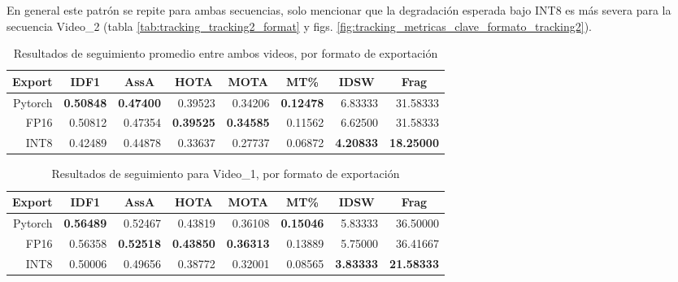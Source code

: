 En general este patrón se repite para ambas secuencias, solo mencionar que la degradación esperada bajo INT8 es más severa para la secuencia Video\_2 (tabla \ref{tab:tracking_tracking2_format} y figs. \ref{fig:tracking_metricas_clave_formato_tracking2}).

\begin{table}[htbp]
\centering
\caption[Resultados de seguimiento promedio entre ambos videos, por formato de exportación.]{Resultados de seguimiento promedio entre ambos videos, por formato de exportación}
\label{tab:tracking_average_format}
\begin{tabular}{|r|r|r|r|r|r|r|r|}
\hline
\multicolumn{1}{|c|}{\textbf{Export}} & \multicolumn{1}{c|}{\textbf{IDF1}} & \multicolumn{1}{c|}{\textbf{AssA}} & \multicolumn{1}{c|}{\textbf{HOTA}} & \multicolumn{1}{c|}{\textbf{MOTA}} & \multicolumn{1}{c|}{\textbf{MT\%}} & \multicolumn{1}{c|}{\textbf{IDSW}} & \multicolumn{1}{c|}{\textbf{Frag}} \\ \hline
Pytorch & \textbf{0.50848} & \textbf{0.47400} & 0.39523 & 0.34206 & \textbf{0.12478} & 6.83333 & 31.58333 \\ \hline
FP16 & 0.50812 & 0.47354 & \textbf{0.39525} & \textbf{0.34585} & 0.11562 & 6.62500 & 31.58333 \\ \hline
INT8 & 0.42489 & 0.44878 & 0.33637 & 0.27737 & 0.06872 & \textbf{4.20833} & \textbf{18.25000} \\ \hline
\end{tabular}
\end{table}

\begin{table}[htbp]
\centering
\caption[Resultados de seguimiento para Video\_1, por formato de exportación.]{Resultados de seguimiento para Video\_1, por formato de exportación}
\label{tab:tracking_tracking1_format}
\begin{tabular}{|r|r|r|r|r|r|r|r|}
\hline
\multicolumn{1}{|c|}{\textbf{Export}} & \multicolumn{1}{c|}{\textbf{IDF1}} & \multicolumn{1}{c|}{\textbf{AssA}} & \multicolumn{1}{c|}{\textbf{HOTA}} & \multicolumn{1}{c|}{\textbf{MOTA}} & \multicolumn{1}{c|}{\textbf{MT\%}} & \multicolumn{1}{c|}{\textbf{IDSW}} & \multicolumn{1}{c|}{\textbf{Frag}} \\ \hline
Pytorch & \textbf{0.56489} & 0.52467 & 0.43819 & 0.36108 & \textbf{0.15046} & 5.83333 & 36.50000 \\ \hline
FP16 & 0.56358 & \textbf{0.52518} & \textbf{0.43850} & \textbf{0.36313} & 0.13889 & 5.75000 & 36.41667 \\ \hline
INT8 & 0.50006 & 0.49656 & 0.38772 & 0.32001 & 0.08565 & \textbf{3.83333} & \textbf{21.58333} \\ \hline
\end{tabular}
\end{table}

